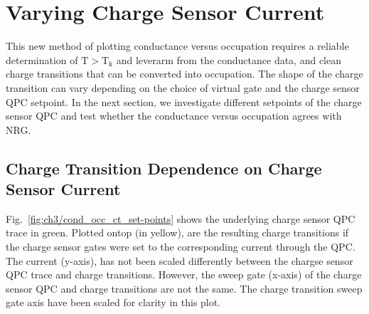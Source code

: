 \section{Varying Charge Sensor Current}

This new method of plotting conductance versus occupation requires a reliable determination of $\mathrm{T>T_k}$ and leverarm from the conductance data, and clean charge transitions that can be converted into occupation. The shape of the charge transition can vary depending on the choice of virtual gate and the charge sensor QPC setpoint. In the next section, we investigate different setpoints of the charge sensor QPC and test whether the conductance versus occupation agrees with NRG.

\subsection{Charge Transition Dependence on Charge Sensor Current}

Fig.~\ref{fig:ch3/cond_occ_ct_set-points} shows the underlying charge sensor QPC trace in green. Plotted ontop (in yellow), are the resulting charge transitions if the charge sensor gates were set to the corresponding current through the QPC. The current (y-axis), has not been scaled differently between the chargse sensor QPC trace and charge transitions. However, the sweep gate (x-axis) of the charge sensor QPC and charge transitions are not the same. The charge transition sweep gate axis have been scaled for clarity in this plot. 



